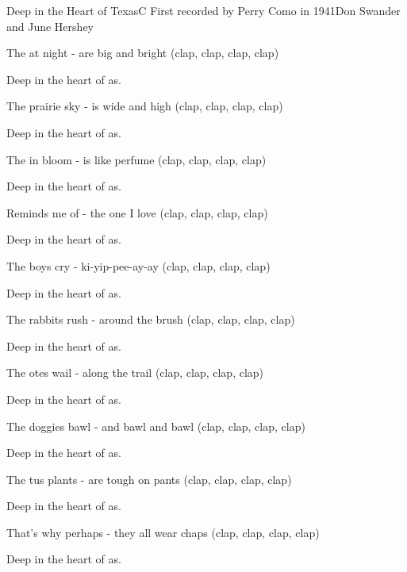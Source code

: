 \begin{SBSong}{Deep in the Heart of Texas}{C}
  {First recorded by Perry Como in 1941}{Don Swander and June Hershey}
  \begin{SBVerse}
    The  at night - are big and bright (clap, clap, clap, clap)

    Deep in the heart of as.

    The prairie sky - is wide and high (clap, clap, clap, clap)

    Deep in the heart of as.
  \end{SBVerse}
  \begin{SBVerse}
    The  in bloom - is like perfume (clap, clap, clap, clap)

    Deep in the heart of as.

    Reminds me of - the one I love (clap, clap, clap, clap)

    Deep in the heart of as.
  \end{SBVerse}
  \begin{SBVerse}
    The boys cry - ki-yip-pee-ay-ay (clap, clap, clap, clap)

    Deep in the heart of as.

    The rabbits rush - around the brush (clap, clap, clap, clap)

    Deep in the heart of as.
  \end{SBVerse}
  \begin{SBVerse}
    The otes wail - along the trail (clap, clap, clap, clap)

    Deep in the heart of as.

    The doggies bawl - and bawl and bawl (clap, clap, clap, clap)

    Deep in the heart of as.
  \end{SBVerse}
  \begin{SBVerse}
    The tus plants - are tough on pants (clap, clap, clap, clap)

    Deep in the heart of as.

    That's why perhaps - they all wear chaps (clap, clap, clap, clap)

    Deep in the heart of as.
  \end{SBVerse}
\end{SBSong}
